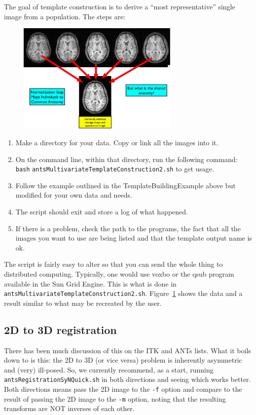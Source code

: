 \documentclass{InsightArticle}
\begin{document}
The goal of template construction is to derive a ``most representative'' single image from a population. 
The steps are: 
\begin{figure}
\center \includegraphics[width=0.7\textwidth]{Figures/templateex.jpg} 
\label{fig:template}
\end{figure}
\begin{enumerate}
\item   Make a directory for your data.   Copy or link all the images into it.
\item  On the command line, within that directory, run the following command: 
\texttt{bash}  \texttt{antsMultivariateTemplateConstruction2.sh}  to get usage. 
\item   Follow the example outlined in the TemplateBuildingExample
  above but modified for your own data and needs. 
\item The script should exit and store a log of what happened. 
\item If there is a problem, check the path to the programs, the fact that all the images you want to use are being 
listed and that the template output name is ok.  
\end{enumerate}
The script is fairly easy to alter so that you can send the whole thing to distributed computing. 
Typically, one would use voxbo or the qsub program available in the Sun Grid Engine.  This 
is what is done in \texttt{antsMultivariateTemplateConstruction2.sh}.  
Figure~\ref{fig:template} shows the data and a result similar to what may be recreated by the user.

\subsection{2D to 3D registration}
There has been much discussion of this on the ITK and ANTs lists.
What it boils down to is this:  the 2D to 3D (or vice versa) problem
is inherently asymmetric and (very) ill-posed.  So, we currently
recommend, as a start, running \texttt{antsRegistrationSyNQuick.sh} in both
directions and seeing which works better.   Both directions means pass
the 2D image to the \texttt{-f} option and compare to the result of passing
the 2D image to the \texttt{-m} option, noting that the resulting transforms are NOT inverses of
each other.
\end{document}
